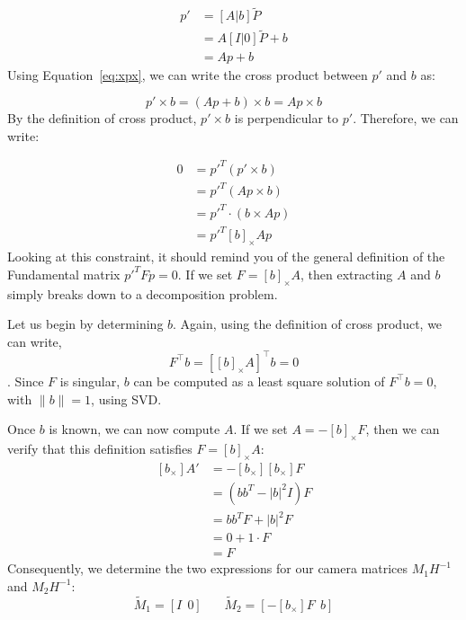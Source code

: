 \documentclass[a4paper, 12pt]{article}
\numberwithin{equation}{section}
\begin{document}
\begin{equation}
    \begin{split}
        p'&= [A|b] \widetilde{P}\\
        &= A[I|0] \widetilde{P} +b \\
        &= Ap+b
    \end{split}
    \label{eq:xpx}
\end{equation}
Using Equation~\ref{eq:xpx}, we can write the cross product between $p'$ and $b$ as:

\begin{equation}
    p' \times b = (Ap+b) \times b = Ap \times b 
    \label{eq:xptimesb}
\end{equation}
By the definition of cross product, $p' \times b$ is perpendicular to $p'$. Therefore, we can write:

\begin{equation}
    \begin{split}
        0 &= p'^T  ( p' \times b )  \\
        &= p'^T  (Ap \times b )\\
        &= p'^T \cdot (b \times Ap) \\
        & = p'^T[b]_\times Ap
    \end{split}
    \label{eq:xpdot1}
\end{equation}
Looking at this constraint, it should remind you of the general definition of the Fundamental matrix $p'^T Fp = 0$. If we set $F=[b]_\times A$, then extracting $A$ and $b$ simply breaks down to a decomposition problem. 

Let us begin by determining $b$. Again, using the definition of cross product, we can write, 
\begin{equation}
    F^{\top}b = [[b]_\times A]^{\top} b = 0
    \label{eq:cross_b}
\end{equation}.  
Since $F$ is singular, $b$ can be computed as a least square solution of $F^{\top} b = 0$, with $\|b\|=1$, using SVD. 

Once $b$ is known, we can now compute $A$. If we set $A=-[b]_\times F$, then we can verify that this definition satisfies $F = [b]_\times A$:
\begin{equation}
    \begin{split}
        [b_\times]A' &= -[b_\times][b_\times]F \\
        & =(bb^T - |b|^2I)F \\
        &= bb^TF + |b|^2F \\
        &= 0 + 1\cdot F \\
        &=F
    \end{split}
    \label{eq:bap}
\end{equation}
Consequently, we determine the two expressions for our camera matrices $M_1H^{-1}$ and $M_2H^{-1}$:
\begin{equation}
    \tilde{M}_1 = [I ~~ 0] ~~~~~~~~ \tilde{M}_2 = [- [b_\times]F ~~ b]
    \label{eq:mm}
\end{equation}
\end{document}
